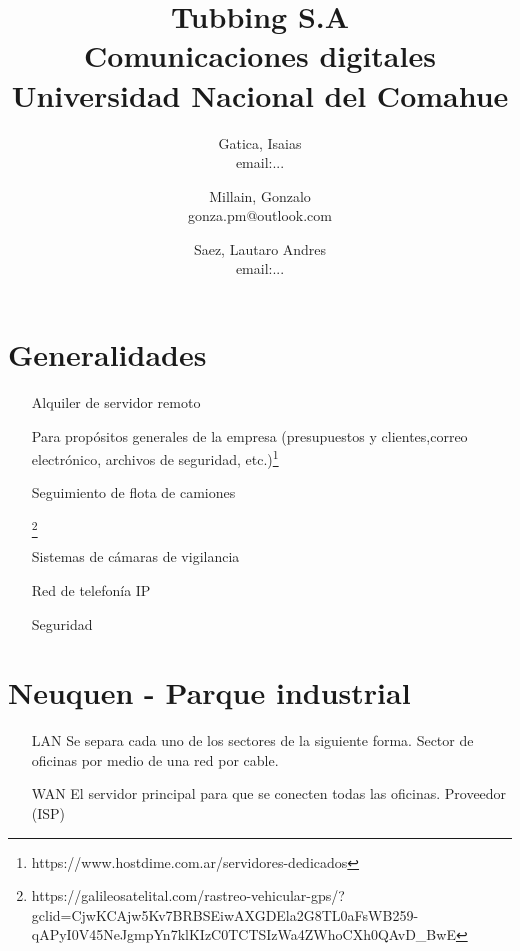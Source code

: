 \documentclass[11pt,a4paper]{article}
\title{Tubbing S.A \\ \small{Comunicaciones digitales} \\ \small{Universidad Nacional del Comahue} }
\author{ 
        Gatica, Isaias \\ \small{email:...} \and 
        Millain, Gonzalo \\ \small{gonza.pm@outlook.com} \and
        Saez, Lautaro Andres \\ \small{email:...} 

}
\date{}
\begin{document}
    \maketitle
    \section*{Generalidades}
    
        \begin{itemize}

        \item [Alquiler de servidor remoto] 
            
        Para propósitos generales de la empresa      (presupuestos y clientes,correo electrónico, archivos de seguridad, etc.)\footnote{https://www.hostdime.com.ar/servidores-dedicados}
            
        \item [Seguimiento de flota de camiones] 
            
        \footnote{https://galileosatelital.com/rastreo-vehicular-gps/?gclid=CjwKCAjw5Kv7BRBSEiwAXGDEla2G8TL0aFsWB259-qAPyI0V45NeJgmpYn7klKIzC0TCTSIzWa4ZWhoCXh0QAvD_BwE}
            
        \item [Sistemas de cámaras de vigilancia] %
            
        \item [Red de telefonía IP] %
        
        \item [Seguridad] %
            
        \end{itemize}
    
    
    \section*{Neuquen - Parque industrial}
        \begin{itemize}
        \item[LAN] %
        Se separa cada uno de los sectores de la siguiente forma. Sector de oficinas por medio de una red por cable. %
        
        \item[WAN] El servidor principal para que se conecten todas las oficinas. Proveedor (ISP)
        
        \end{itemize}
\end{document}
